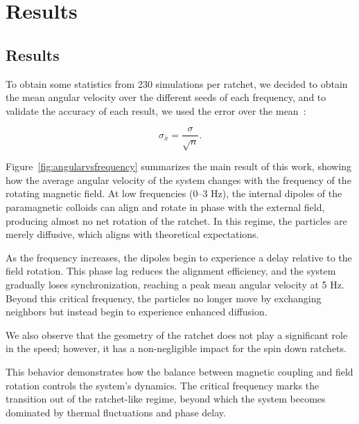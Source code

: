\part{Results}
\label{part:results}

\chapter{Results}

To obtain some statistics from 230 simulations per ratchet, we decided to obtain the mean angular velocity over the different seeds of each frequency, and to validate the accuracy of each result, we used the error over the mean~\cite{altman2005standard}:

\begin{equation}
  \sigma_{\bar{x}} = \displaystyle\frac{\sigma}{\sqrt{n}}.
  \label{eq:errormean}
\end{equation}

Figure~\ref{fig:angularvsfrequency} summarizes the main result of this work, showing how the average angular velocity of the system changes with the frequency of the rotating magnetic field. At low frequencies (0–3 Hz), the internal dipoles of the paramagnetic colloids can align and rotate in phase with the external field, producing almost no net rotation of the ratchet. In this regime, the particles are merely diffusive, which aligns with theoretical expectations.

As the frequency increases, the dipoles begin to experience a delay relative to the field rotation. This phase lag reduces the alignment efficiency, and the system gradually loses synchronization, reaching a peak mean angular velocity at 5 Hz. Beyond this critical frequency, the particles no longer move by exchanging neighbors but instead begin to experience enhanced diffusion.

We also observe that the geometry of the ratchet does not play a significant role in the speed; however, it has a non-negligible impact for the spin down ratchets.

This behavior demonstrates how the balance between magnetic coupling and field rotation controls the system's dynamics. The critical frequency marks the transition out of the ratchet-like regime, beyond which the system becomes dominated by thermal fluctuations and phase delay.


